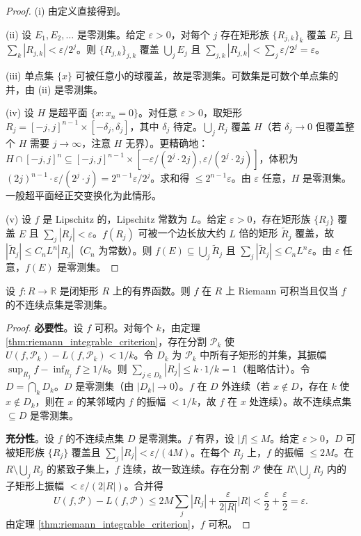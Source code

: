 \begin{proof}
(i) 由定义直接得到。

(ii) 设 $E_1, E_2, \dots$ 是零测集。给定 $\varepsilon > 0$，对每个 $j$ 存在矩形族 $\{R_{j,k}\}_k$ 覆盖 $E_j$ 且 $\sum_k |R_{j,k}| < \varepsilon / 2^j$。则 $\{R_{j,k}\}_{j,k}$ 覆盖 $\bigcup_j E_j$ 且 $\sum_{j,k} |R_{j,k}| < \sum_j \varepsilon / 2^j = \varepsilon$。

(iii) 单点集 $\{x\}$ 可被任意小的球覆盖，故是零测集。可数集是可数个单点集的并，由 (ii) 是零测集。

(iv) 设 $H$ 是超平面 $\{x : x_n = 0\}$。对任意 $\varepsilon > 0$，取矩形 $R_j = [-j, j]^{n-1} \times [-\delta_j, \delta_j]$，其中 $\delta_j$ 待定。$\bigcup_j R_j$ 覆盖 $H$（若 $\delta_j \to 0$ 但覆盖整个 $H$ 需要 $j \to \infty$，注意 $H$ 无界）。更精确地：$H \cap [-j, j]^n \subseteq [-j, j]^{n-1} \times [-\varepsilon/(2^j \cdot 2j), \varepsilon/(2^j \cdot 2j)]$，体积为 $(2j)^{n-1} \cdot \varepsilon/(2^j \cdot j) = 2^{n-1} \varepsilon / 2^j$。求和得 $\le 2^{n-1} \varepsilon$。由 $\varepsilon$ 任意，$H$ 是零测集。一般超平面经正交变换化为此情形。

(v) 设 $f$ 是 Lipschitz 的，Lipschitz 常数为 $L$。给定 $\varepsilon > 0$，存在矩形族 $\{R_j\}$ 覆盖 $E$ 且 $\sum_j |R_j| < \varepsilon$。$f(R_j)$ 可被一个边长放大约 $L$ 倍的矩形 $\tilde{R}_j$ 覆盖，故 $|\tilde{R}_j| \le C_n L^n |R_j|$（$C_n$ 为常数）。则 $f(E) \subseteq \bigcup_j \tilde{R}_j$ 且 $\sum_j |\tilde{R}_j| \le C_n L^n \varepsilon$。由 $\varepsilon$ 任意，$f(E)$ 是零测集。
\end{proof}

\begin{theorem}\label{thm:riemann_lebesgue_criterion}
设 $f: R \to \mathbb{R}$ 是闭矩形 $R$ 上的有界函数。则 $f$ 在 $R$ 上 Riemann 可积当且仅当 $f$ 的不连续点集是零测集。
\end{theorem}

\begin{proof}
\textbf{必要性}。设 $f$ 可积。对每个 $k$，由定理 \ref{thm:riemann_integrable_criterion}，存在分割 $\mathcal{P}_k$ 使 $U(f, \mathcal{P}_k) - L(f, \mathcal{P}_k) < 1/k$。令 $D_k$ 为 $\mathcal{P}_k$ 中所有子矩形的并集，其振幅 $\sup_{R_j} f - \inf_{R_j} f \ge 1/k$。则 $\sum_{j \in D_k} |R_j| \le k \cdot 1/k = 1$（粗略估计）。令 $D = \bigcap_k D_k$。$D$ 是零测集（由 $|D_k| \to 0$）。$f$ 在 $D$ 外连续（若 $x \notin D$，存在 $k$ 使 $x \notin D_k$，则在 $x$ 的某邻域内 $f$ 的振幅 $< 1/k$，故 $f$ 在 $x$ 处连续）。故不连续点集 $\subseteq D$ 是零测集。

\textbf{充分性}。设 $f$ 的不连续点集 $D$ 是零测集。$f$ 有界，设 $|f| \le M$。给定 $\varepsilon > 0$，$D$ 可被矩形族 $\{R_j\}$ 覆盖且 $\sum_j |R_j| < \varepsilon / (4M)$。在每个 $R_j$ 上，$f$ 的振幅 $\le 2M$。在 $R \setminus \bigcup_j R_j$ 的紧致子集上，$f$ 连续，故一致连续。存在分割 $\mathcal{P}$ 使在 $R \setminus \bigcup_j R_j$ 内的子矩形上振幅 $< \varepsilon / (2|R|)$。合并得
\[
U(f, \mathcal{P}) - L(f, \mathcal{P}) \le 2M \sum_j |R_j| + \frac{\varepsilon}{2|R|} |R| < \frac{\varepsilon}{2} + \frac{\varepsilon}{2} = \varepsilon.
\]
由定理 \ref{thm:riemann_integrable_criterion}，$f$ 可积。
\end{proof}

